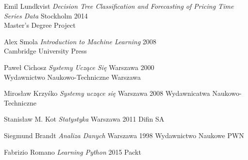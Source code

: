 \documentclass[man,mfi|min|mpt|mok|mub|mza|miz|bsp]{mgrwms}
\begin{document}
\begin{thebibliography}{88}
 Emil Lundkvist
\textit{Decision Tree Classiﬁcation and Forecasting of Pricing Time Series Data} Stockholm 2014\\
Master’s Degree Project

 Alex Smola
\textit{Introduction to Machine Learning} 2008\\
Cambridge University Press

 Paweł Cichosz
\textit{Systemy Uczące Się} Warszawa 2000\\
Wydawnictwo Naukowo-Techniczne Warszawa

 Mirosław Krzyśko
\textit{Systemy uczące się} Warszawa 2008
Wydawnicatwa Naukowo-Techniczne

 Stanisław M. Kot
\textit{Statystyka} Warszawa 2011
Difin SA

 Siegmund Brandt
\textit{Analiza Danych} Warszawa 1998
Wydawnictwo Naukowe PWN

 Fabrizio Romano
\textit{Learning Python} 2015
Packt

\end{thebibliography}
%
%  
%
\listoffigures
%
\listoftables
%
\end{document}
